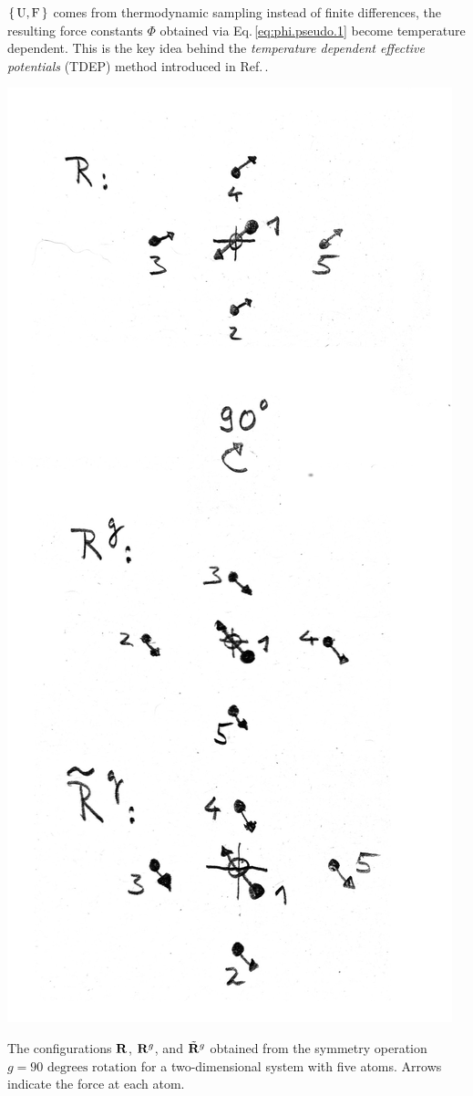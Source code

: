  $\set{ {\rm U}, {\rm F} }$ comes from thermodynamic sampling instead of finite differences, the resulting force constants $\Phi$ obtained via Eq.\,\eqref{eq:phi.pseudo.1} become temperature dependent. This is the key idea behind the \emph{temperature dependent effective potentials} (TDEP) method introduced in Ref.\,\cite{Hellman.2013}.

\begin{marginfigure}
	\centering
	\includegraphics[width=\textwidth]{./data/sketches/symop.jpg}
	\caption{The configurations ${\bf R}$, ${\bf R}^g$, and $\tilde{{\bf R}}^g$ obtained from the symmetry operation $g=\text{90 degrees rotation}$ for a two-dimensional system with five atoms. Arrows indicate the force at each atom.}
	\label{fig:symmetry.1}
\end{marginfigure}

